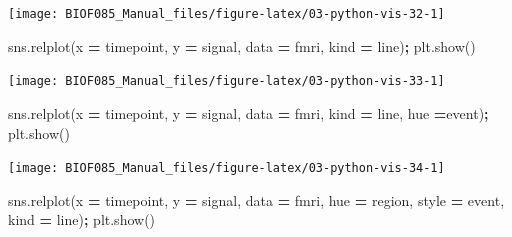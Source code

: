 \documentclass[
  letterpaper,
]{scrbook}
\newenvironment{Shaded}{\begin{snugshade}}{\end{snugshade}}
\newcommand{\NormalTok}[1]{#1}
\newcommand{\OperatorTok}[1]{\textcolor[rgb]{0.81,0.36,0.00}{\textbf{#1}}}
\newcommand{\StringTok}[1]{\textcolor[rgb]{0.31,0.60,0.02}{#1}}
\begin{document}
\begin{center}\texttt{[image: BIOF085\_Manual\_files/figure-latex/03-python-vis-32-1]} \end{center}

\begin{Shaded}
\begin{Highlighting}[]
\NormalTok{sns.relplot(x }\OperatorTok{=} \StringTok{\textquotesingle{}timepoint\textquotesingle{}}\NormalTok{, y }\OperatorTok{=} \StringTok{\textquotesingle{}signal\textquotesingle{}}\NormalTok{, data }\OperatorTok{=}\NormalTok{ fmri, kind }\OperatorTok{=} \StringTok{\textquotesingle{}line\textquotesingle{}}\NormalTok{)}\OperatorTok{;}
\NormalTok{plt.show()}
\end{Highlighting}
\end{Shaded}

\begin{center}\texttt{[image: BIOF085\_Manual\_files/figure-latex/03-python-vis-33-1]} \end{center}

\begin{Shaded}
\begin{Highlighting}[]
\NormalTok{sns.relplot(x }\OperatorTok{=} \StringTok{\textquotesingle{}timepoint\textquotesingle{}}\NormalTok{, y }\OperatorTok{=} \StringTok{\textquotesingle{}signal\textquotesingle{}}\NormalTok{, data }\OperatorTok{=}\NormalTok{ fmri, kind }\OperatorTok{=} \StringTok{\textquotesingle{}line\textquotesingle{}}\NormalTok{, hue }\OperatorTok{=}\StringTok{\textquotesingle{}event\textquotesingle{}}\NormalTok{)}\OperatorTok{;}
\NormalTok{plt.show()}
\end{Highlighting}
\end{Shaded}

\begin{center}\texttt{[image: BIOF085\_Manual\_files/figure-latex/03-python-vis-34-1]} \end{center}

\begin{Shaded}
\begin{Highlighting}[]
\NormalTok{sns.relplot(x }\OperatorTok{=} \StringTok{\textquotesingle{}timepoint\textquotesingle{}}\NormalTok{, y }\OperatorTok{=} \StringTok{\textquotesingle{}signal\textquotesingle{}}\NormalTok{, data }\OperatorTok{=}\NormalTok{ fmri, hue }\OperatorTok{=} \StringTok{\textquotesingle{}region\textquotesingle{}}\NormalTok{, }
\NormalTok{            style }\OperatorTok{=} \StringTok{\textquotesingle{}event\textquotesingle{}}\NormalTok{, kind }\OperatorTok{=} \StringTok{\textquotesingle{}line\textquotesingle{}}\NormalTok{)}\OperatorTok{;}
\NormalTok{plt.show()}
\end{Highlighting}
\end{Shaded}
\end{document}
